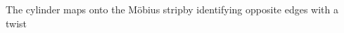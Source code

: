 \documentclass[preview]{standalone}
\begin{document}
\begin{center}
The cylinder maps onto the Möbius stripby identifying opposite edges with a twist
\end{center}
\end{document}

